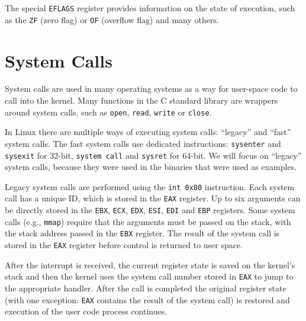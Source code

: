 \documentclass[draft,final]{vutinfth} %
\begin{document}
The special \texttt{EFLAGS} register provides information on the state of execution, such as the \texttt{ZF} (zero flag) or \texttt{OF} (overflow flag) and many others.

\section{System Calls}
\label{system calls}

System calls are used in many operating systems as a way for user-space code to call into the kernel. Many functions in the C standard library are wrappers around system calls, such as \texttt{open}, \texttt{read}, \texttt{write} or \texttt{close}.

In Linux there are multiple ways of executing system calls\cite[Chapter 10]{UnderstandingKernel}: ``legacy'' and ``fast'' system calls. The fast system calls use dedicated instructions: \texttt{sysenter} and \texttt{sysexit} for 32-bit, \texttt{system call} and \texttt{sysret} for 64-bit. We will focus on ``legacy'' system calls, because they were used in the binaries that were used as examples.

Legacy system calls are performed using the \texttt{int 0x80} instruction. Each system call has a unique ID, which is stored in the \texttt{EAX} register. Up to six arguments can be directly stored in the \texttt{EBX}, \texttt{ECX}, \texttt{EDX}, \texttt{ESI}, \texttt{EDI} and \texttt{EBP} registers. Some system calls (e.g., \texttt{mmap}) require that the arguments must be passed on the stack, with the stack address passed in the \texttt{EBX} register. The result of the system call is stored in the \texttt{EAX} register before control is returned to user space.

After the interrupt is received, the current register state is saved on the kernel's stack and then the kernel uses the system call number stored in \texttt{EAX} to jump to the appropriate handler. After the call is completed the original register state (with one exception: \texttt{EAX} contains the result of the system call) is restored and execution of the user code process continues.
\end{document}
